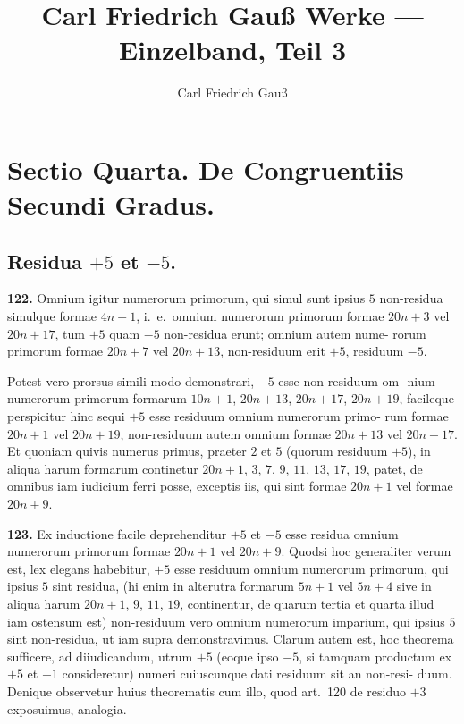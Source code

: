 \documentclass[12pt,a4paper]{article}
\title{Carl Friedrich Gau\ss{} Werke --- Einzelband, Teil 3}
\author{Carl Friedrich Gau\ss}
\date{}
\begin{document}
\maketitle

\section*{Sectio Quarta. De Congruentiis Secundi Gradus.}

\subsection*{Residua $+5$ et $-5$.}

\textbf{122.}
Omnium igitur numerorum primorum, qui simul sunt ipsius $5$ non-residua
simulque formae $4n+1$, i.~e.~omnium numerorum primorum formae $20n+3$
vel $20n+17$, tum $+5$ quam $-5$ non-residua erunt; omnium autem nume-
rorum primorum formae $20n+7$ vel $20n+13$, non-residuum erit $+5$,
residuum $-5$.

Potest vero prorsus simili modo demonstrari, $-5$ esse non-residuum om-
nium numerorum primorum formarum $10n+1$, $20n+13$, $20n+17$, $20n+19$,
facileque perspicitur hinc sequi $+5$ esse residuum omnium numerorum primo-
rum formae $20n+1$ vel $20n+19$, non-residuum autem omnium formae
$20n+13$ vel $20n+17$. Et quoniam quivis numerus primus, praeter $2$ et $5$
(quorum residuum $+5$), in aliqua harum formarum continetur $20n+1$, $3$, $7$, $9$,
$11$, $13$, $17$, $19$, patet, de omnibus iam iudicium ferri posse, exceptis iis, qui sint
formae $20n+1$ vel formae $20n+9$.

\textbf{123.}
Ex inductione facile deprehenditur $+5$ et $-5$ esse residua omnium
numerorum primorum formae $20n+1$ vel $20n+9$. Quodsi hoc generaliter
verum est, lex elegans habebitur, $+5$ esse residuum omnium numerorum primorum,
qui ipsius $5$ sint residua, (hi enim in alterutra formarum $5n+1$ vel $5n+4$ sive
in aliqua harum $20n+1$, $9$, $11$, $19$, continentur, de quarum tertia et quarta
illud iam ostensum est) non-residuum vero omnium numerorum imparium, qui ipsius $5$
sint non-residua, ut iam supra demonstravimus. Clarum autem est, hoc theorema
sufficere, ad diiudicandum, utrum $+5$ (eoque ipso $-5$, si tamquam productum
ex $+5$ et $-1$ consideretur) numeri cuiuscunque dati residuum sit an non-resi-
duum. Denique observetur huius theorematis cum illo, quod art.~120 de residuo
$+3$ exposuimus, analogia.
\end{document}
